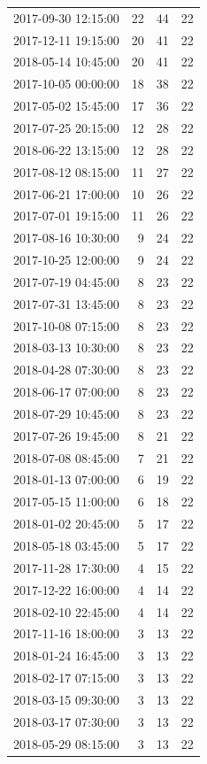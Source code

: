 \begin{tabular}{lrrr}
2017-09-30 12:15:00 & 22 & 44 & 22 \\
2017-12-11 19:15:00 & 20 & 41 & 22 \\
2018-05-14 10:45:00 & 20 & 41 & 22 \\
2017-10-05 00:00:00 & 18 & 38 & 22 \\
2017-05-02 15:45:00 & 17 & 36 & 22 \\
2017-07-25 20:15:00 & 12 & 28 & 22 \\
2018-06-22 13:15:00 & 12 & 28 & 22 \\
2017-08-12 08:15:00 & 11 & 27 & 22 \\
2017-06-21 17:00:00 & 10 & 26 & 22 \\
2017-07-01 19:15:00 & 11 & 26 & 22 \\
2017-08-16 10:30:00 & 9 & 24 & 22 \\
2017-10-25 12:00:00 & 9 & 24 & 22 \\
2017-07-19 04:45:00 & 8 & 23 & 22 \\
2017-07-31 13:45:00 & 8 & 23 & 22 \\
2017-10-08 07:15:00 & 8 & 23 & 22 \\
2018-03-13 10:30:00 & 8 & 23 & 22 \\
2018-04-28 07:30:00 & 8 & 23 & 22 \\
2018-06-17 07:00:00 & 8 & 23 & 22 \\
2018-07-29 10:45:00 & 8 & 23 & 22 \\
2017-07-26 19:45:00 & 8 & 21 & 22 \\
2018-07-08 08:45:00 & 7 & 21 & 22 \\
2018-01-13 07:00:00 & 6 & 19 & 22 \\
2017-05-15 11:00:00 & 6 & 18 & 22 \\
2018-01-02 20:45:00 & 5 & 17 & 22 \\
2018-05-18 03:45:00 & 5 & 17 & 22 \\
2017-11-28 17:30:00 & 4 & 15 & 22 \\
2017-12-22 16:00:00 & 4 & 14 & 22 \\
2018-02-10 22:45:00 & 4 & 14 & 22 \\
2017-11-16 18:00:00 & 3 & 13 & 22 \\
2018-01-24 16:45:00 & 3 & 13 & 22 \\
2018-02-17 07:15:00 & 3 & 13 & 22 \\
2018-03-15 09:30:00 & 3 & 13 & 22 \\
2018-03-17 07:30:00 & 3 & 13 & 22 \\
2018-05-29 08:15:00 & 3 & 13 & 22 \\

\end{tabular}
